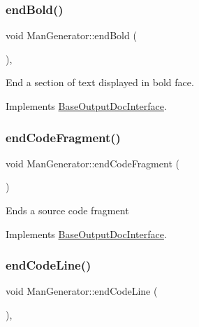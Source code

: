 \subsubsection{\texorpdfstring{endBold()}{endBold()}}
{\footnotesize\ttfamily void Man\+Generator\+::end\+Bold (\begin{DoxyParamCaption}{ }\end{DoxyParamCaption})\hspace{0.3cm}{\ttfamily [inline]}, {\ttfamily [virtual]}}

End a section of text displayed in bold face. 

Implements \mbox{\hyperlink{class_base_output_doc_interface_a2a17911ba778f8efac83999fb5d190d9}{Base\+Output\+Doc\+Interface}}.

\mbox{\label{class_man_generator_a4e825c27561ebb51c155840d9101725a}} 
\subsubsection{\texorpdfstring{endCodeFragment()}{endCodeFragment()}}
{\footnotesize\ttfamily void Man\+Generator\+::end\+Code\+Fragment (\begin{DoxyParamCaption}{ }\end{DoxyParamCaption})\hspace{0.3cm}{\ttfamily [virtual]}}

Ends a source code fragment 

Implements \mbox{\hyperlink{class_base_output_doc_interface_a08f032482a8f23ac1aab66552db43a81}{Base\+Output\+Doc\+Interface}}.

\mbox{\label{class_man_generator_a0f0040036147c71754651d0701029f70}} 
\subsubsection{\texorpdfstring{endCodeLine()}{endCodeLine()}}
{\footnotesize\ttfamily void Man\+Generator\+::end\+Code\+Line (\begin{DoxyParamCaption}{ }\end{DoxyParamCaption})\hspace{0.3cm}{\ttfamily [inline]}, {\ttfamily [virtual]}}

